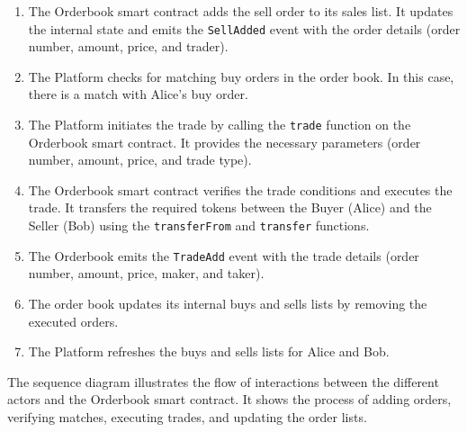 \begin{enumerate}
   \item The Orderbook smart contract adds the sell order to its sales list. It updates the internal state and emits the \texttt{SellAdded} event with the order details (order number, amount, price, and trader).
   \item The Platform checks for matching buy orders in the order book. In this case, there is a match with Alice's buy order.
   \item The Platform initiates the trade by calling the \texttt{trade} function on the Orderbook smart contract. It provides the necessary parameters (order number, amount, price, and trade type).
   \item The Orderbook smart contract verifies the trade conditions and executes the trade. It transfers the required tokens between the Buyer (Alice) and the Seller (Bob) using the \texttt{transferFrom} and \texttt{transfer} functions.
   \item The Orderbook emits the \texttt{TradeAdd} event with the trade details (order number, amount, price, maker, and taker).
   \item The order book updates its internal buys and sells lists by removing the executed orders.
   \item The Platform refreshes the buys and sells lists for Alice and Bob.
\end{enumerate}

The sequence diagram illustrates the flow of interactions between the different actors and the Orderbook smart contract. It shows the process of adding orders, verifying matches, executing trades, and updating the order lists.



